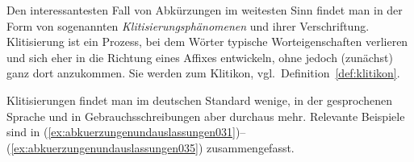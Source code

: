 Den interessantesten Fall von Abkürzungen im weitesten Sinn findet man in der Form von sogenannten \textit{Klitisierungsphänomenen} und ihrer Verschriftung.
Klitisierung ist ein Prozess, bei dem Wörter typische Worteigenschaften verlieren und sich eher in die Richtung eines Affixes entwickeln, ohne jedoch (zunächst) ganz dort anzukommen.
Sie werden zum Klitikon, vgl.\ Definition~\ref{def:klitikon}.


Klitisierungen findet man im deutschen Standard wenige, in der gesprochenen Sprache und in Gebrauchsschreibungen aber durchaus mehr.
Relevante Beispiele sind in (\ref{ex:abkuerzungenundauslassungen031})--(\ref{ex:abkuerzungenundauslassungen035}) zusammengefasst.

\begin{exe}
  \ex\label{ex:abkuerzungenundauslassungen032}
  \begin{xlist}
  \end{xlist}

  \ex\label{ex:abkuerzungenundauslassungen035}
  \begin{xlist}
  \end{xlist}
\end{exe}

